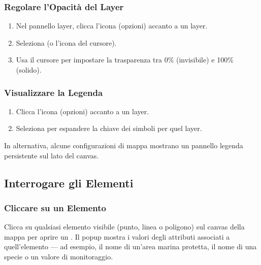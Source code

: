 \documentclass[letterpaper,10pt,english]{sphinxmanual}
\begin{document}
\subsubsection{Regolare l’Opacità del Layer}
\label{\detokenize{it/04_esplorare_mappe:regolare-l-opacita-del-layer}}\begin{enumerate}
%
\item {} 
\sphinxAtStartPar
Nel pannello layer, clicca l’icona  (opzioni) accanto a un layer.

\item {} 
\sphinxAtStartPar
Seleziona  (o l’icona del cursore).

\item {} 
\sphinxAtStartPar
Usa il cursore  per impostare la trasparenza tra 0\% (invisibile) e 100\%
(solido).

\end{enumerate}


\subsubsection{Visualizzare la Legenda}
\label{\detokenize{it/04_esplorare_mappe:visualizzare-la-legenda}}\begin{enumerate}
%
\item {} 
\sphinxAtStartPar
Clicca l’icona  (opzioni) accanto a un layer.

\item {} 
\sphinxAtStartPar
Seleziona  per espandere la chiave dei simboli per quel layer.

\end{enumerate}

\sphinxAtStartPar
In alternativa, alcune configurazioni di mappa mostrano un pannello legenda persistente
sul lato del canvas.


\subsection{Interrogare gli Elementi}
\label{\detokenize{it/04_esplorare_mappe:interrogare-gli-elementi}}

\subsubsection{Cliccare su un Elemento}
\label{\detokenize{it/04_esplorare_mappe:cliccare-su-un-elemento}}
\sphinxAtStartPar
Clicca su qualsiasi elemento visibile (punto, linea o poligono) sul canvas della mappa
per aprire un . Il pop\sphinxhyphen{}up mostra i valori degli attributi
associati a quell’elemento — ad esempio, il nome di un’area marina protetta, il nome
di una specie o un valore di monitoraggio.
\end{document}
